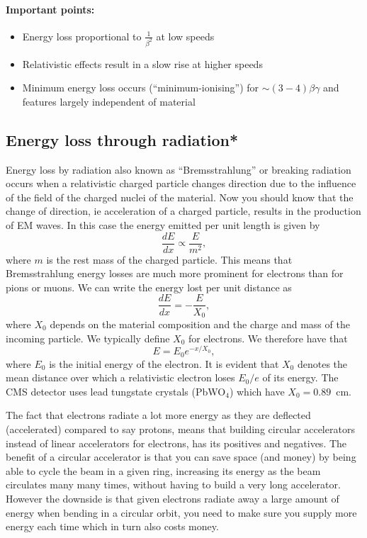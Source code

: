 \paragraph{Important points:}
\begin{itemize}
\item Energy loss proportional to $\frac{1}{\beta^2}$ at low speeds
\item Relativistic effects result in a slow rise at higher speeds
\item Minimum energy loss occurs (``minimum-ionising'') for $\sim (3-4)\beta\gamma$ and features largely independent of material
\end{itemize}

\subsection{Energy loss through radiation*}
Energy loss by radiation also known as ``Bremsstrahlung'' or breaking radiation occurs when a relativistic charged particle changes direction due to the influence of the field of the charged nuclei of the material. Now you should know that the change of direction, ie acceleration of a charged particle, results in the production of EM waves. In this case the energy emitted per unit length is given by
\begin{equation}
\frac{dE}{dx}\propto \frac{E}{m^2},
\end{equation}
where $m$ is the rest mass of the charged particle. This means that Bremsstrahlung energy losses are much more prominent for electrons than for pions or muons. We can write the energy lost per unit distance as
\begin{equation}
\frac{dE}{dx}=-\frac{E}{X_{0}},
\end{equation}
where $X_0$ depends on the material composition and the charge and mass of the incoming particle. We typically define $X_0$ for electrons. We therefore have that
\begin{equation}
E=E_0e^{-x/X_0},
\end{equation}
where $E_0$ is the initial energy of the electron.
It is evident that $X_0$ denotes the mean distance over which a relativistic electron loses $E_0/e$ of its energy. The CMS detector uses lead tungstate crystals (PbWO$_4$) which have $X_0=0.89$~cm.

The fact that electrons radiate a lot more energy as they are deflected (accelerated) compared to say protons, means that building circular accelerators instead of linear accelerators for electrons, has its positives and negatives. The benefit of a circular accelerator is that you can save space (and money) by being able to cycle the beam in a given ring, increasing its energy as the beam circulates many many times, without having to build a very long accelerator. However the downside is that given electrons radiate away a large amount of energy when bending in a circular orbit, you need to make sure you supply more energy each time which in turn also costs money.

